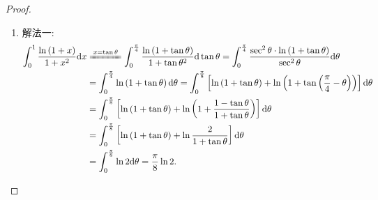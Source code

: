 \documentclass[../../main.tex]{subfiles}
\begin{document}
\begin{proof}
\begin{enumerate}
\item {\color{blue}解法一:}
\begin{align*}
\int_0^1{\frac{\ln \left( 1+x \right)}{1+x^2}\mathrm{d}x}&\xlongequal{x=\tan \theta}\int_0^{\frac{\pi}{4}}{\frac{\ln \left( 1+\tan \theta \right)}{1+\tan \theta ^2}\mathrm{d}\tan \theta}=\int_0^{\frac{\pi}{4}}{\frac{\sec ^2\theta \cdot \ln \left( 1+\tan \theta \right)}{\sec ^2\theta}\mathrm{d}\theta}
\\
&=\int_0^{\frac{\pi}{4}}{\ln \left( 1+\tan \theta \right) \mathrm{d}\theta}=\int_0^{\frac{\pi}{8}}{\left[ \ln \left( 1+\tan \theta \right) +\ln \left( 1+\tan \left( \frac{\pi}{4}-\theta \right) \right) \right] \mathrm{d}\theta}
\\
&=\int_0^{\frac{\pi}{8}}{\left[ \ln \left( 1+\tan \theta \right) +\ln \left( 1+\frac{1-\tan \theta}{1+\tan \theta} \right) \right] \mathrm{d}\theta}
\\
&=\int_0^{\frac{\pi}{8}}{\left[ \ln \left( 1+\tan \theta \right) +\ln \frac{2}{1+\tan \theta} \right] \mathrm{d}\theta}
\\
&=\int_0^{\frac{\pi}{8}}{\ln 2\mathrm{d}\theta}=\frac{\pi}{8}\ln 2.
\end{align*} 


\end{enumerate}
\end{proof}
\end{document}
